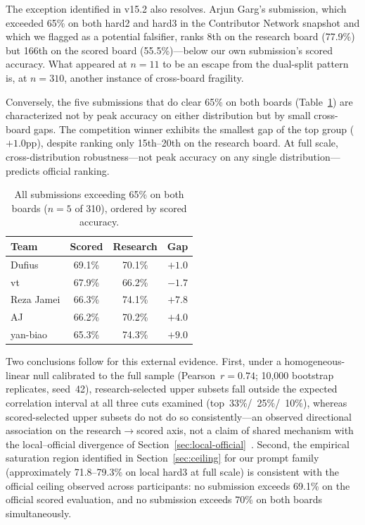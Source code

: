 \documentclass[11pt]{article}
\begin{document}
The exception identified in v15.2 also resolves. Arjun Garg's
submission, which exceeded 65\% on both hard2 and hard3 in the
Contributor Network snapshot and which we flagged as a potential
falsifier, ranks 8th on the research board
(77.9\%) but 166th on the scored board (55.5\%)---below our own
submission's scored accuracy. What appeared at $n{=}11$ to be an escape
from the dual-split pattern is, at $n{=}310$, another instance of
cross-board fragility.

Conversely, the five submissions that do clear 65\% on both boards
(Table~\ref{tab:robustfive}) are characterized not by peak accuracy on
either distribution but by small cross-board gaps. The competition
winner exhibits the smallest gap of the top group
($+1.0$pp), despite ranking only 15th--20th on the research board. At
full scale, cross-distribution robustness---not peak accuracy on any
single distribution---predicts official ranking.

\begin{table}[t]
\centering
\caption{All submissions exceeding 65\% on both boards ($n{=}5$ of
310), ordered by scored accuracy.}
\label{tab:robustfive}
\begin{tabular}{lccc}
\toprule
Team & Scored & Research & Gap \\
\midrule
Dufius & 69.1\% & 70.1\% & $+1.0$ \\
vt & 67.9\% & 66.2\% & $-1.7$ \\
Reza Jamei & 66.3\% & 74.1\% & $+7.8$ \\
AJ & 66.2\% & 70.2\% & $+4.0$ \\
yan-biao & 65.3\% & 74.3\% & $+9.0$ \\
\bottomrule
\end{tabular}
\end{table}

Two conclusions follow for this external evidence. First, under a
homogeneous-linear null calibrated to the full sample
(Pearson~$r{=}0.74$; 10{,}000 bootstrap replicates, seed~42),
research-selected upper subsets fall outside the expected correlation
interval at all three cuts examined (top~33\%/~25\%/~10\%), whereas
scored-selected upper subsets do not do so consistently---an observed
directional association on the research$\to$scored axis, not a claim of
shared mechanism with the local--official divergence of
Section~\ref{sec:local-official}~\citep{cazares2026sair}. Second, the
empirical saturation region identified in Section~\ref{sec:ceiling} for
our prompt family (approximately 71.8--79.3\% on local hard3 at full
scale) is consistent with the official ceiling observed across
participants: no submission exceeds 69.1\% on the official scored
evaluation, and no submission exceeds 70\% on both boards
simultaneously.
\end{document}

